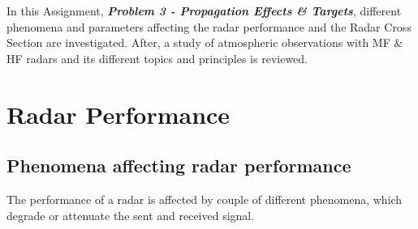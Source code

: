 

In this Assignment, \textit{\textbf{Problem 3 - Propagation Effects \& Targets}}, different phenomena and parameters affecting the radar performance and the Radar Cross Section are investigated. After, a study of atmospheric observations with MF \& HF radars and its different topics and principles is reviewed.


\section{Radar Performance}

\subsection{Phenomena affecting radar performance}
\label{chap:diffraction}
The performance of a radar is affected by couple of different phenomena, which degrade or attenuate the sent and received signal.
